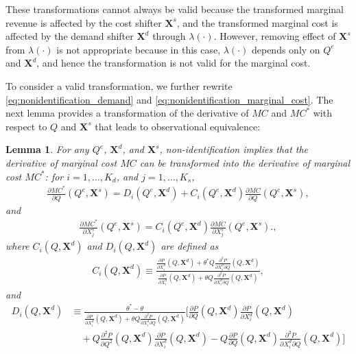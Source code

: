 \documentclass[11pt, a4paper]{article}
\newtheorem{lemma}{Lemma}
\begin{document}
These transformations cannot always be valid because the transformed marginal revenue is affected by the cost shifter $\bm{X}^{s}$, and the transformed marginal cost is affected by the demand shifter $\bm{X}^{d}$ through $\lambda(\cdot)$.
However, removing effect of $\bm{X}^{s}$ from $\lambda(\cdot)$ is not appropriate because in this case, $\lambda(\cdot)$ depends only on $Q^e$ and $\bm{X}^{d}$, and hence the transformation is not valid for the marginal cost.

To consider a valid transformation, we further rewrite \eqref{eq:nonidentification_demand} and \eqref{eq:nonidentification_marginal_cost}.
The next lemma provides a transformation of the derivative of $MC$ and $MC^{*}$ with respect to $Q$ and $\bm{X}^{s}$ that leads to observational equivalence:
\begin{lemma}\label{lemma:mc_transformation}
    For any $Q^e$, $\bm{X}^{d}$, and $\bm{X}^{s}$, non-identification implies that the derivative of marginal cost $MC$ can be transformed into the derivative of marginal cost $MC^{*}$: for $i = 1, \ldots, K_d$, and $j = 1, \ldots, K_s$,
    \begin{align}
        \frac{\partial MC^{*}}{\partial Q}(Q^e, \bm{X}^{s}) =D_i(Q^e, \bm{X}^{d}) + C_i(Q^e, \bm{X}^{d})\frac{\partial MC}{\partial Q}(Q^e, \bm{X}^{s}),\label{eq:mc_transformation_quantity}
    \end{align}
    and
    \begin{align}
        \frac{\partial MC^{*}}{\partial X^{s}_j}(Q^e, \bm{X}^{s}) = C_i(Q^e, \bm{X}^{d})\frac{\partial MC}{\partial X^{s}_j}(Q^e, \bm{X}^{s}).\label{eq:mc_transformation_cost_shifter},
    \end{align}
    where $C_i(Q, \bm{X}^{d})$ and $D_i(Q, \bm{X}^{d})$ are defined as
    \begin{align}
        C_i(Q, \bm{X}^{d}) \equiv \frac{\frac{\partial P}{\partial X^{d}_i}(Q, \bm{X}^{d}) + \theta^{*} Q\frac{\partial^2 P}{\partial X^{d}_i\partial Q}(Q, \bm{X}^{d}) }{\frac{\partial P}{\partial X^{d}_i}(Q, \bm{X}^{d}) + \theta Q\frac{\partial^2 P}{\partial X^{d}_i\partial Q}(Q, \bm{X}^{d}) },\label{eq:ratio_marginal_revenue}
    \end{align}
    and
    \begin{align}
        D_i(Q, \bm{X}^{d}) & \equiv\frac{\theta^{*} - \theta}{\frac{\partial P}{\partial X^{d}_i}(Q, \bm{X}^{d}) + \theta Q\frac{\partial^2 P}{\partial X^{d}_i\partial Q}(Q, \bm{X}^{d})}\Bigg[\frac{\partial P}{\partial Q}(Q, \bm{X}^{d}) \frac{\partial P}{\partial X^{d}_i}(Q, \bm{X}^{d})\\
        &\quad + Q\frac{\partial^2 P}{\partial Q^2}(Q, \bm{X}^{d}) \frac{\partial P}{\partial X^{d}_i}(Q, \bm{X}^{d}) - Q \frac{\partial P}{\partial Q}(Q, \bm{X}^{d}) \frac{\partial^2 P}{\partial X^{d}_i\partial Q}(Q, \bm{X}^{d}) \Bigg]\label{eq:intercation_derivative_demand}
    \end{align}
\end{lemma}
\end{document}
